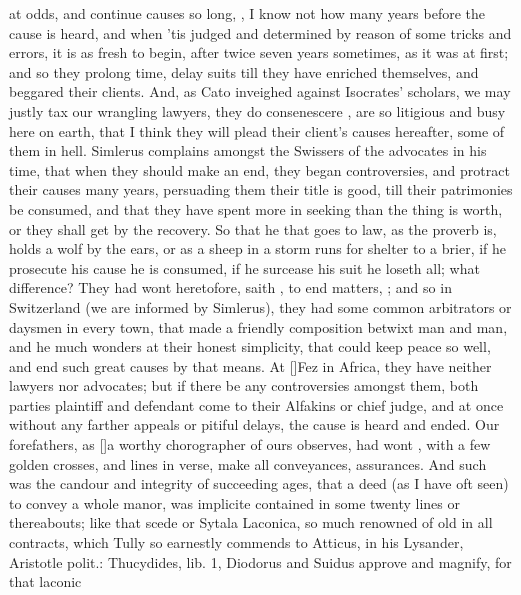 at odds, and continue causes so long, , I know not how
many years before the cause is heard, and when 'tis judged and
determined by reason of some tricks and errors, it is as fresh to
begin, after twice seven years sometimes, as it was at first; and so
they prolong time, delay suits till they have enriched themselves, and
beggared their clients. And, as Cato inveighed against Isocrates'
scholars, we may justly tax our wrangling lawyers, they do consenescere
, are so litigious and busy here on earth, that I think they
will plead their client's causes hereafter, some of them in hell. 
Simlerus complains amongst the Swissers of the advocates in his time,
that when they should make an end, they began controversies, and
protract their causes many years, persuading them their title is good,
till their patrimonies be consumed, and that they have spent more in
seeking than the thing is worth, or they shall get by the recovery. So
that he that goes to law, as the proverb is, holds a wolf by the
ears, or as a sheep in a storm runs for shelter to a brier, if he
prosecute his cause he is consumed, if he surcease his suit he loseth
all; what difference? They had wont heretofore, saith \Austin{}, to
end matters, ; and so in Switzerland (we are
informed by Simlerus), they had some common arbitrators or daysmen
in every town, that made a friendly composition betwixt man and man,
and he much wonders at their honest simplicity, that could keep peace
so well, and end such great causes by that means. At [\baselineskip]Fez in
Africa, they have neither lawyers nor advocates; but if there be any
controversies amongst them, both parties plaintiff and defendant come
to their Alfakins or chief judge, and at once without any farther
appeals or pitiful delays, the cause is heard and ended. Our
forefathers, as [\baselineskip]a worthy chorographer of ours observes, had wont
, with a few golden crosses, and lines in
verse, make all conveyances, assurances. And such was the candour and
integrity of succeeding ages, that a deed (as I have oft seen) to
convey a whole manor, was implicite contained in some twenty lines or
thereabouts; like that scede or Sytala Laconica, so much renowned of
old in all contracts, which Tully so earnestly commends to
Atticus,  in his Lysander, Aristotle polit.: Thucydides, lib.
1, Diodorus and Suidus approve and magnify, for that laconic
